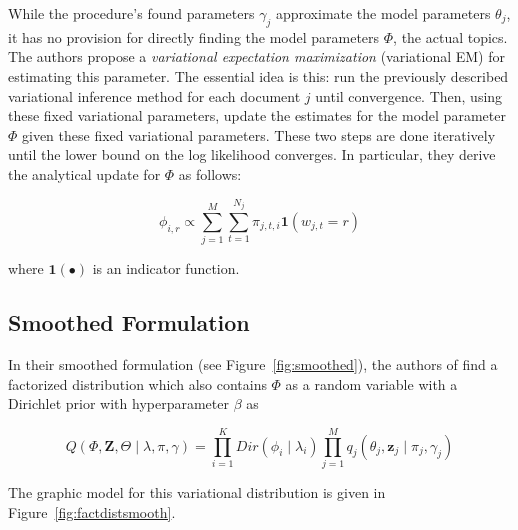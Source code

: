 \documentclass[11pt]{article}
\begin{document}
While the procedure's found parameters $\gamma_j$ approximate the model
parameters $\theta_j$, it has no provision for directly finding the model
parameters $\Phi$, the actual topics. The authors propose a
\emph{variational expectation maximization} (variational EM) for estimating
this parameter. The essential idea is this: run the previously described
variational inference method for each document $j$ until convergence. Then,
using these fixed variational parameters, update the estimates for the
model parameter $\Phi$ given these fixed variational parameters. These two
steps are done iteratively until the lower bound on the log likelihood
converges. In particular, they derive the analytical update for $\Phi$ as
follows:

\begin{equation}
  \phi_{i,r} \propto \sum_{j=1}^M \sum_{t=1}^{N_j}
  \pi_{j,t,i}\mathbf{1}(w_{j,t} = r)
  \label{eqn:varemphi}
\end{equation}

where $\mathbf{1}(\bullet)$ is an indicator function.


\subsection{Smoothed Formulation}

In their smoothed formulation (see Figure~\ref{fig:smoothed}), the authors
of \cite{Blei:2003:LDA} find a factorized distribution which also contains
$\Phi$ as a random variable with a Dirichlet prior with hyperparameter
$\beta$ as

\begin{equation}
  Q(\Phi, \mathbf{Z}, \Theta \mid \lambda, \pi, \gamma) =
  \prod_{i=1}^K Dir(\phi_i \mid \lambda_i) \prod_{j=1}^M q_j(\theta_j,
  \mathbf{z}_j \mid \pi_j, \gamma_j)
\end{equation}

The graphic model for this variational distribution is given in
Figure~\ref{fig:factdistsmooth}.
\end{document}
